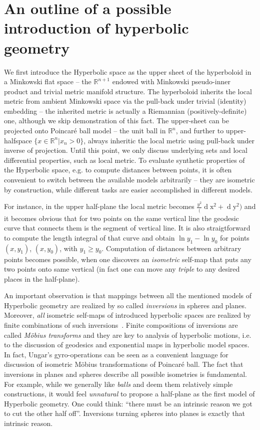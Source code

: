 \section{An outline of a possible introduction of hyperbolic geometry}

We first introduce the Hyperbolic space as the upper sheet of the hyperboloid in
a Minkowski flat space -- the \( \mathbb{R}^{n+1} \) endowed with Minkowski
pseudo-inner product and trivial metric manifold structure.
The hyperboloid inherits the local metric from ambient Minkowski space via the
pull-back under trivial (identity) embedding -- the inherited metric is
actually a Riemannian (positively-definite) one, although we skip demonstration
of this fact.
The upper-sheet can be projected onto Poincar\'e ball model -- the unit ball in
\( \mathbb{R}^n \), and further to upper-halfspace
\( \{x\in\mathbb{R}^n\left|x_n > 0 \right. \} \), always inheritic the local
metric using pull-back under inverse of projection.  Until this point, we only
discuss underlying sets and local differential properties, such as local
metric. To evaluate synthetic properties of the Hyperbolic space, e.g. to
compute distances between points, it is often convenient to switch between the
available models arbitrarily -- they are isometric by construction, while
different tasks are easier accomplished in different models.

For instance, in the upper half-plane the local metric becomes \(
\frac{y^2}(\operatorname{d}\mathrm{x}^2 + \operatorname{d}\mathrm{y}^2) \) and
it becomes obvious that for two points on the same vertical line the geodesic
curve that connects them is the segment of vertical line.  It is also
straigtforward to compute the length integral of that curve and obtain \( \ln
y_1 - \ln y_0 \) for points \( (x, y_1) \), \( (x, y_0) \), with \( y_1 \geq
y_0 \). Computation of distances between arbitrary points becomes possible,
when one discovers an \emph{isometric} self-map that puts any two points onto
same vertical (in fact one can move any \emph{triple} to any desired places in
the half-plane).

An important observation is that mappings between all the mentioned models of
Hyperbolic geometry are realized by so called \emph{inversions} in spheres and
planes. Moreover, \emph{all} isometric self-maps of introduced hyperbolic
spaces are realized by finite combinations of such
inversions~\cite{beardonMindaHyp,beardonGeometryDiscrete,visualComplexAn}.
Finite compositions
of inversions are called \emph{M\"obius transforms} and they are key to
analysis of hyperbolic motions, i.e. to the discussion of geodesics and
exponential maps in hyperbolic model spaces. In fact, Ungar's gyro-operations
can be seen as a convenient language for discussion of isometric M\"obius
transformations of Poincar\'e ball.  The fact that inversions in planes and
spheres describe all possible isometries is fundamental. For example, while we
generally like \emph{balls} and deem them relatively simple constructions, it
would feel \emph{unnatural} to propose a half-plane as the first model of
Hyperbolic geometry. One could think: ``there must be an intrinsic reason we
got to cut the other half off''. Inversions turning spheres into planes is
exactly that intrinsic reason.

